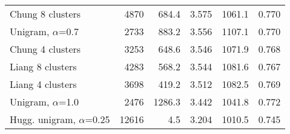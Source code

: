 \begin{table}
\begin{tabular}{lrrrrr}
Chung 8 clusters & 4870 & 684.4 & 3.575 & 1061.1 & 0.770 \\
Unigram, $\alpha$=0.7 & 2733 & 883.2 & 3.556 & 1107.1 & 0.770 \\
Chung 4 clusters & 3253 & 648.6 & 3.546 & 1071.9 & 0.768 \\
Liang 8 clusters & 4283 & 568.2 & 3.544 & 1081.6 & 0.767 \\
Liang 4 clusters & 3698 & 419.2 & 3.512 & 1082.5 & 0.769 \\
Unigram, $\alpha$=1.0 & 2476 & 1286.3 & 3.442 & 1041.8 & 0.772 \\
Hugg. unigram, $\alpha$=0.25 & 12616 & 4.5 & 3.204 & 1010.5 & 0.745 \\
\bottomrule
\end{tabular}
\end{table}
